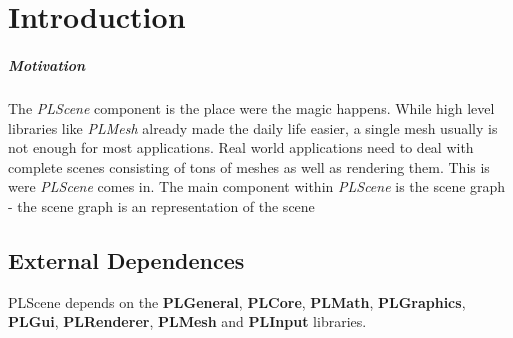 \chapter{Introduction}


\paragraph{Motivation}
The \emph{PLScene} component is the place were the magic happens. While high level libraries like \emph{PLMesh} already made the daily life easier, a single mesh usually is not enough for most applications. Real world applications need to deal with complete scenes consisting of tons of meshes as well as rendering them. This is were \emph{PLScene} comes in. The main component within \emph{PLScene} is the scene graph - the scene graph is an representation of the scene




\section{External Dependences}
PLScene depends on the \textbf{PLGeneral}, \textbf{PLCore}, \textbf{PLMath}, \textbf{PLGraphics}, \textbf{PLGui}, \textbf{PLRenderer}, \textbf{PLMesh} and \textbf{PLInput} libraries.
